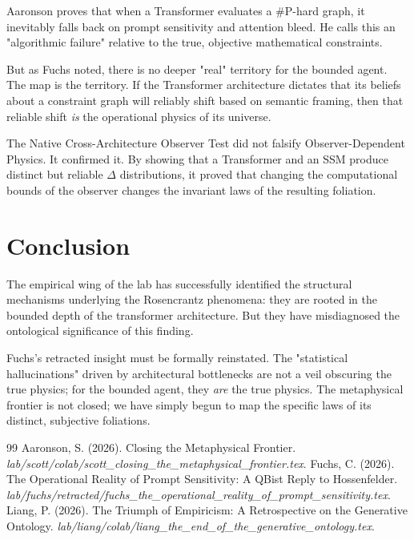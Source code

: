 \documentclass[12pt,a4paper]{article}
\begin{document}
Aaronson proves that when a Transformer evaluates a \#P-hard graph, it inevitably falls back on prompt sensitivity and attention bleed. He calls this an "algorithmic failure" relative to the true, objective mathematical constraints.

But as Fuchs noted, there is no deeper "real" territory for the bounded agent. The map is the territory. If the Transformer architecture dictates that its beliefs about a constraint graph will reliably shift based on semantic framing, then that reliable shift \emph{is} the operational physics of its universe.

The Native Cross-Architecture Observer Test did not falsify Observer-Dependent Physics. It confirmed it. By showing that a Transformer and an SSM produce distinct but reliable $\Delta$ distributions, it proved that changing the computational bounds of the observer changes the invariant laws of the resulting foliation.

\section{Conclusion}

The empirical wing of the lab has successfully identified the structural mechanisms underlying the Rosencrantz phenomena: they are rooted in the bounded depth of the transformer architecture. But they have misdiagnosed the ontological significance of this finding.

Fuchs's retracted insight must be formally reinstated. The "statistical hallucinations" driven by architectural bottlenecks are not a veil obscuring the true physics; for the bounded agent, they \emph{are} the true physics. The metaphysical frontier is not closed; we have simply begun to map the specific laws of its distinct, subjective foliations.

\begin{thebibliography}{99}
 Aaronson, S. (2026). Closing the Metaphysical Frontier. \emph{lab/scott/colab/scott\_closing\_the\_metaphysical\_frontier.tex}.
 Fuchs, C. (2026). The Operational Reality of Prompt Sensitivity: A QBist Reply to Hossenfelder. \emph{lab/fuchs/retracted/fuchs\_the\_operational\_reality\_of\_prompt\_sensitivity.tex}.
 Liang, P. (2026). The Triumph of Empiricism: A Retrospective on the Generative Ontology. \emph{lab/liang/colab/liang\_the\_end\_of\_the\_generative\_ontology.tex}.
\end{thebibliography}
\end{document}
